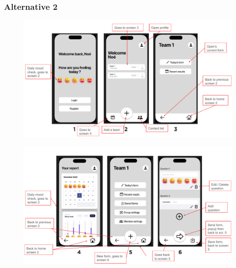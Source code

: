 \documentclass[11pt]{article}
\begin{document}
\subsubsection{Alternative 2}

\begin{figure}[!h]
    \centering
    \includegraphics[width = \textwidth]{figures/figmaMockup-1.pdf}
\end{figure}
\begin{figure}[!h]
    \centering
    \includegraphics[width = \textwidth]{figures/figmaMockup-2.pdf}
\end{figure}



\printbibliography

\end{document}
